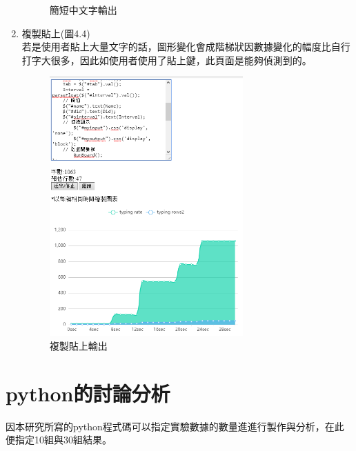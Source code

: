\begin{enumerate}[1.]
\begin{figure}[H]
		\caption{簡短中文字輸出} 
		\label{Fig.4.3} 
	\end{figure}
	\item 複製貼上(圖4.4)\\
	若是使用者貼上大量文字的話，圖形變化會成階梯狀因數據變化的幅度比自行打字大很多，因此如使用者使用了貼上鍵，此頁面是能夠偵測到的。
	\begin{figure}[H] 
		\centering 
		\includegraphics[width=0.7\textwidth]{4_4.png} 
		\caption{複製貼上輸出} 
		\label{Fig.4.4} 
	\end{figure}
\end{enumerate}
\section{python的討論分析}
因本研究所寫的python程式碼可以指定實驗數據的數量進進行製作與分析，在此便指定10組與30組結果。
